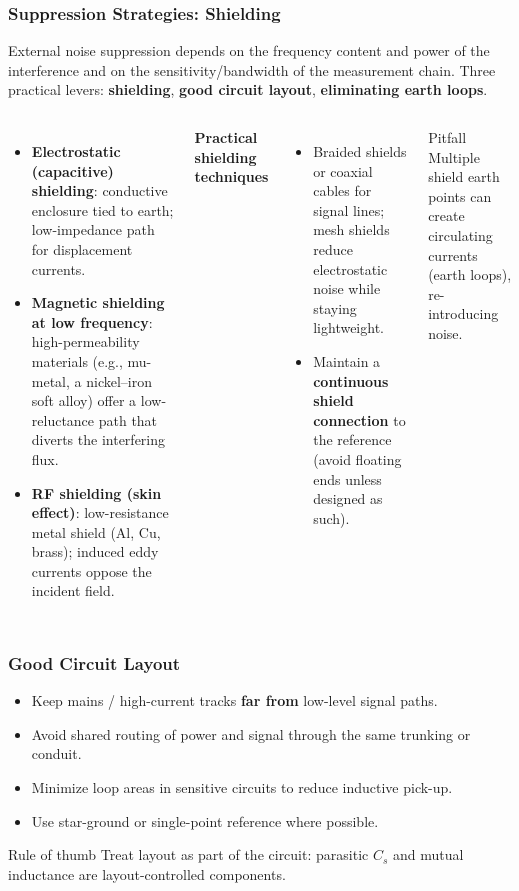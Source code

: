 \begin{frame}
	\frametitle{Suppression Strategies: Shielding}
	\small
	External noise suppression depends on the frequency content and power of the interference and on the sensitivity/bandwidth of the measurement chain. Three practical levers: \textbf{shielding}, \textbf{good circuit layout}, \textbf{eliminating earth loops}.
	\begin{columns}[T]
		\begin{itemize}
			\item \textbf{Electrostatic (capacitive) shielding}: conductive enclosure tied to earth; low-impedance path for displacement currents.
			\item \textbf{Magnetic shielding at low frequency}: high-permeability materials (e.g., mu-metal, a nickel--iron soft alloy) offer a low-reluctance path that diverts the interfering flux.
			\item \textbf{RF shielding (skin effect)}: low-resistance metal shield (Al, Cu, brass); induced eddy currents oppose the incident field.
		\end{itemize}
		\textbf{Practical shielding techniques}
		\begin{itemize}
			\item Braided shields or coaxial cables for signal lines; mesh shields reduce electrostatic noise while staying lightweight.
			\item Maintain a \textbf{continuous shield connection} to the reference (avoid floating ends unless designed as such).
		\end{itemize}
		\begin{block}{Pitfall}
			Multiple shield earth points can create circulating currents (earth loops), re-introducing noise.
		\end{block}
	\end{columns}
\end{frame}

\begin{frame}
	\frametitle{Good Circuit Layout}
	\begin{itemize}
		\item Keep mains / high-current tracks \textbf{far from} low-level signal paths.
		\item Avoid shared routing of power and signal through the same trunking or conduit.
		\item Minimize loop areas in sensitive circuits to reduce inductive pick-up.
		\item Use star-ground or single-point reference where possible.
	\end{itemize}
	\begin{block}{Rule of thumb}
		Treat layout as part of the circuit: parasitic $C_s$ and mutual inductance are layout-controlled components.
	\end{block}
\end{frame}

